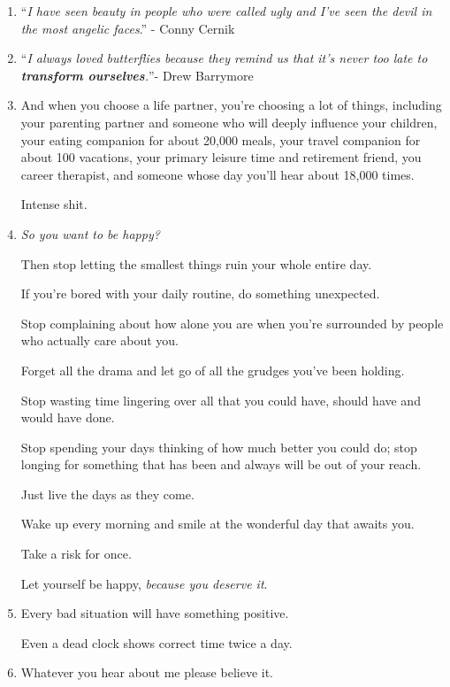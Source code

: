 \documentclass{article}
\numberwithin{equation}{section}
\begin{document}
\begin{enumerate}
    I know you're tired, you're fed up, you're so close to breaking but there's strength within you, even when you feel weak.
    
    Keep fighting.
    \item ``\textit{I have seen beauty in people who were called ugly and I've seen the devil in the most angelic faces}.'' - Conny Cernik
    \item ``\textit{I always loved butterflies because they remind us that it's never too late to \textbf{transform ourselves}.}''- Drew Barrymore
    \item And when you choose a life partner, you're choosing a lot of things, including your parenting partner and someone who will deeply influence your children, your eating companion for about 20,000 meals, your travel companion for about 100 vacations, your primary leisure time and retirement friend, you career therapist, and someone whose day you'll hear about 18,000 times.
    
    Intense shit.
    \item \textit{So you want to be happy?}
    
    Then stop letting the smallest things ruin your whole entire day.
    
    If you're bored with your daily routine, do something unexpected.
    
    Stop complaining about how alone you are when you're surrounded by people who actually care about you.
    
    Forget all the drama and let go of all the grudges you've been holding.
    
    Stop wasting time lingering over all that you could have, should have and would have done.
    
    Stop spending your days thinking of how much better you could do; stop longing for something that has been and always will be out of your reach.
    
    Just live the days as they come.
    
    Wake up every morning and smile at the wonderful day that awaits you.
    
    Take a risk for once.
    
    Let yourself be happy, \textit{because you deserve it}.
    \item Every bad situation will have something positive.
    
    Even a dead clock shows correct time twice a day.
    \item Whatever you hear about me please believe it.
    

\end{enumerate}
\end{document}
